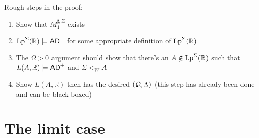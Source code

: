 \documentclass[../../main]{subfiles}
\begin{document}

Rough steps in the proof:
\begin{enumerate}
  \item Show that $M_1^{\sharp,\Sigma}$ exists
  \item $\operatorname{Lp}^\Sigma(\mathbb R)\models\textsf{AD}^+$ for some appropriate
    definition of $\operatorname{Lp}^\Sigma(\mathbb R)$
  \item The $\Omega>0$ argument should show that there's an
    $A\notin\operatorname{Lp}^\Sigma(\mathbb R)$ such that
    $L(A,\mathbb R)\models\textsf{AD}^+$ and $\Sigma <_W A$
  \item Show $L(A,\mathbb R)$ then has the desired $(\operatorname{\mathcal Q},\Lambda)$
    (this step has already been done and can be black boxed)
\end{enumerate}

\section{The limit case}

\end{document}
